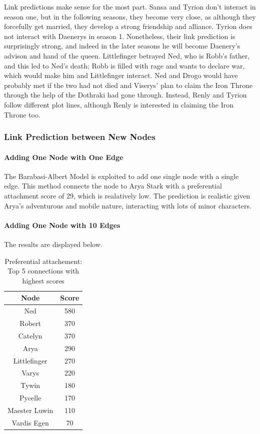 \documentclass[10pt,twocolumn,letterpaper]{article}
\begin{document}
Link predictions make sense for the most part. Sansa and Tyrion don't interact in season one, but in the following seasons, they become very close, as although they forcefully get married, they develop a strong friendship and alliance. Tyrion does not interact with Daenerys in season 1. Nonetheless, their link prediction is surprisingly strong, and indeed in the later seasons he will become Daenery's advison and hand of the queen. Littlefinger betrayed Ned, who is Robb's father, and this led to Ned's death; Robb is filled with rage and wants to declare war, which would make him and Littlefinger interact.
Ned and Drogo would have probably met if the two had not died and Viserys' plan to claim the Iron Throne through the help of the Dothraki had gone through.
Instead, Renly and Tyrion follow different plot lines, although Renly is interested in claiming the Iron Throne too. 


\subsubsection{Link Prediction between New Nodes}

\paragraph{Adding One Node with One Edge}

The Barabasi-Albert Model is exploited to add one single node with a single edge. This method connects the node to Arya Stark with a preferential attachment score of 29, which is realatively low. The prediction is realistic given Arya's adventurous and mobile nature, interacting with lots of minor characters.

\paragraph{Adding One Node with 10 Edges}

The results are displayed below.

\begin{table}[!h]
    \centering
    \small
    \begin{tabular}{c|c} 
    Node & Score \\
    \hline
    Ned	& 580 \\
    Robert	& 370\\
    Catelyn	& 370\\
    Arya & 290\\
    Littlefinger &  270\\
    Varys & 220\\
    Tywin  &180\\
    Pycelle & 170\\
    Maester Luwin & 110\\
    Vardis Egen &	70\\
    \hline 
    \end{tabular} 
    \vspace{0.2cm}
    \caption{Preferential attachement: Top 5 connections with highest scores}
    \label{tab:my_label}
\end{table}
\end{document}
